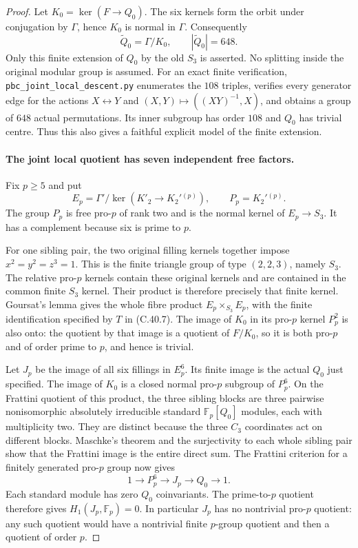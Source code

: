 \begin{proof}
Let $K_0=\ker(F\to Q_0)$. The six kernels form the
orbit under conjugation by $\Gamma$, hence $K_0$ is
normal in $\Gamma$. Consequently
\[
       \widetilde Q_0=\Gamma/K_0,
                 \qquad |\widetilde Q_0|=648.          \tag{C.40.10}
\]
Only this finite extension of $Q_0$ by the old $S_3$
is asserted. No splitting inside the original modular
group is assumed. For an exact finite verification,
\texttt{pbc\_joint\_local\_descent.py} enumerates the
$108$ triples, verifies every generator edge for the
actions $X\leftrightarrow Y$ and
$(X,Y)\mapsto((XY)^{-1},X)$, and obtains a group of
$648$ actual permutations. Its inner subgroup has order
$108$ and $Q_0$ has trivial centre. Thus this also gives
a faithful explicit model of the finite extension.

\paragraph{The joint local quotient has seven independent free factors.}
Fix $p\geq5$ and put
\[
 E_p=\Gamma'/\ker(K'_2\to K_2'{}^{(p)}),\qquad
 P_p=K_2'{}^{(p)}.
                                                        \tag{C.40.11}
\]
The group $P_p$ is free pro-$p$ of rank two and is the
normal kernel of $E_p\to S_3$. It has a complement
because six is prime to $p$.

For one sibling pair, the two original filling kernels
together impose $x^2=y^2=z^3=1$. This is the finite
triangle group of type $(2,2,3)$, namely $S_3$.
The relative pro-$p$ kernels contain these original
kernels and are contained in the common finite
$S_3$ kernel. Their product is therefore precisely
that finite kernel. Goursat's lemma gives the whole
fibre product $E_p\times_{S_3}E_p$, with the finite
identification specified by $T$ in (C.40.7).
The image of $K_0$ in its pro-$p$ kernel $P_p^2$ is
also onto: the quotient by that image is a quotient
of $F/K_0$, so it is both pro-$p$ and of order prime
to $p$, and hence is trivial.

Let $J_p$ be the image of all six fillings in $E_p^6$.
Its finite image is the actual $Q_0$ just specified.
The image of $K_0$ is a closed normal pro-$p$ subgroup
of $P_p^6$. On the Frattini quotient of this product,
the three sibling blocks are three pairwise
nonisomorphic absolutely irreducible standard
$\mathbb F_p[Q_0]$ modules, each with multiplicity two.
They are distinct because the three $C_3$ coordinates
act on different blocks. Maschke's theorem and the
surjectivity to each whole sibling pair show that the
Frattini image is the entire direct sum. The Frattini
criterion for a finitely generated pro-$p$ group now
gives
\[
                1\longrightarrow P_p^6
                  \longrightarrow J_p
                  \longrightarrow Q_0\longrightarrow1.
                                                        \tag{C.40.12}
\]
Each standard module has zero $Q_0$ coinvariants.
The prime-to-$p$ quotient therefore gives
$H_1(J_p,\mathbb F_p)=0$. In particular $J_p$ has no
nontrivial pro-$p$ quotient: any such quotient would
have a nontrivial finite $p$-group quotient and then
a quotient of order $p$.


\end{proof}

